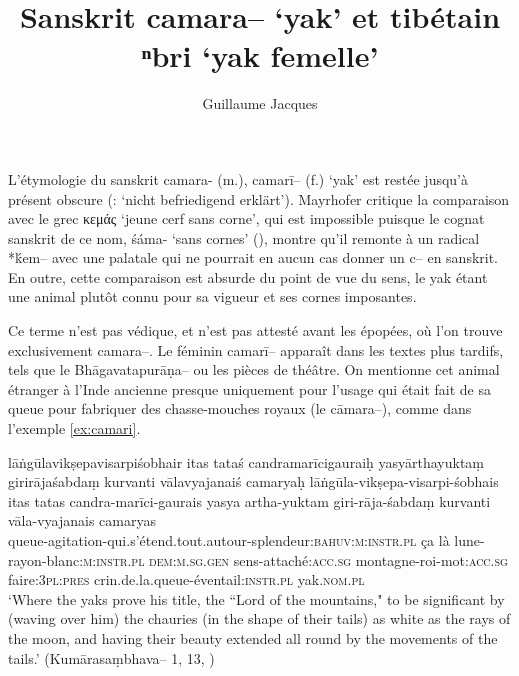 \documentclass[oldfontcommands,oneside,a4paper,11pt]{article}
\newcommand{\ipa}[1]{{\phon #1}} %
\newcommand{\grec}[1]{{\mleccha #1}}
\begin{document}
 
\title{Sanskrit \ipa{camara--} `yak' et tibétain \ipa{ⁿbri} `yak femelle'}
\author{Guillaume Jacques}
\maketitle
L'étymologie du sanskrit \ipa{camara-} (m.), \ipa{camarī--} (f.) `yak' est restée jusqu'à présent obscure (\citealt[I, 375]{mayrhofer56kurz}: `nicht befriedigend erklärt'). Mayrhofer critique la comparaison avec le grec \grec{κεμάς} `jeune cerf sans corne', qui est impossible puisque le cognat sanskrit de ce nom, \ipa{śáma-} `sans cornes' (\citealt[II, 289]{mayrhofer56kurz}), montre qu'il remonte à un radical *\ipa{ḱem--} avec une palatale qui ne pourrait en aucun cas donner un \ipa{c--} en sanskrit. En outre, cette comparaison est absurde du point de vue du sens, le yak étant une animal plutôt connu pour sa vigueur et ses cornes imposantes.


Ce terme n'est pas védique, et n'est pas attesté avant les épopées, où l'on trouve exclusivement   \ipa{camara--}.  Le féminin \ipa{camarī--} apparaît dans les textes plus tardifs, tels que le \ipa{Bhāgavatapurāṇa--} ou les pièces de théâtre. On mentionne cet animal étranger à l'Inde ancienne presque uniquement pour l'usage qui était fait de sa queue pour fabriquer des chasse-mouches royaux (le  \ipa{cāmara--}), comme dans l'exemple \ref{ex:camari}.

\begin{exe}
\ex \label{ex:camari}
\glt lāṅgūlavikṣepavisarpiśobhair itas tataś candramarīcigauraiḥ 
\glt yasyārthayuktaṃ girirājaśabdaṃ kurvanti vālavyajanaiś camaryaḥ 
\gll lāṅgūla-vikṣepa-visarpi-śobhais itas tatas candra-marīci-gaurais yasya artha-yuktam giri-rāja-śabdaṃ kurvanti vāla-vyajanais camaryas \\
queue-agitation-qui.s'étend.tout.autour-splendeur:\textsc{bahuv:m:instr.pl} ça là lune-rayon-blanc:\textsc{m:instr.pl} \textsc{dem:m.sg.gen} sens-attaché:\textsc{acc.sg} montagne-roi-mot:\textsc{acc.sg} faire:\textsc{3pl:pres} crin.de.la.queue-éventail\textsc{:instr.pl} yak.\textsc{nom.pl} \\
\glt  `Where the yaks prove his title, the ``Lord of the mountains,"  to be significant by (waving over him) the chauries (in the shape of their tails) as white as the rays of the moon, and having their beauty extended all round by the movements of the tails.' (\ipa{Kumārasaṃbhava--} 1, 13, \citealt[204]{kale17kumarasambhava})
\end{exe}
\end{document}
